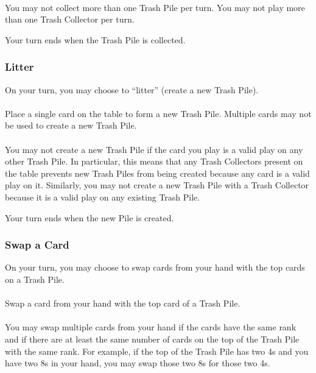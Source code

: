 \documentclass{article}
\begin{document}
\paragraph{} \label{par:collectsingle}
You may not collect more than one Trash Pile per turn. You may not play more than one Trash Collector per turn.

Your turn ends when the Trash Pile is collected.

\subsubsection{Litter}
\label{sec:litter}

On your turn, you may choose to ``litter'' (create a new Trash Pile).

\paragraph{} \label{par:littercreate}
Place a single card on the table to form a new Trash Pile. Multiple cards may not be used to create a new Trash Pile.

\paragraph{} \label{par:litterrestriction}
You may not create a new Trash Pile if the card you play is a valid play on any other Trash Pile. In particular, this means that any Trash Collectors present on the table prevents new Trash Piles from being created because any card is a valid play on it. Similarly, you may not create a new Trash Pile with a Trash Collector because it is a valid play on any existing Trash Pile.

Your turn ends when the new Pile is created.

\subsubsection{Swap a Card}
\label{sec:swap}

On your turn, you may choose to swap cards from your hand with the top cards on a Trash Pile.

\paragraph{} \label{par:swaptop}
Swap a card from your hand with the top card of a Trash Pile.

\paragraph{} \label{par:swapmultiple}
You may swap multiple cards from your hand if the cards have the same rank and if there are at least the same number of cards on the top of the Trash Pile with the same rank. For example, if the top of the Trash Pile has two 4s and you have two 8s in your hand, you may swap those two 8s for those two 4s.
\end{document}
